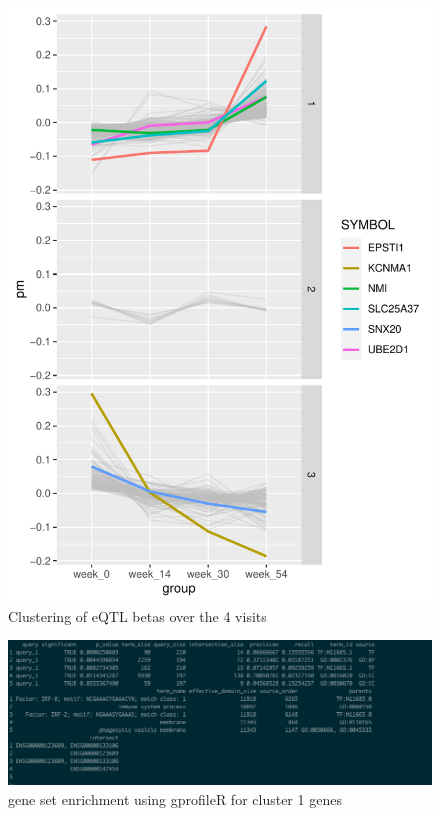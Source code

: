 \begin{outline}
\begin{figure}
    \centering
    \includegraphics[width=1.0\textwidth,page=1]{mainmatter/figures/chapter_04/plot_dge_eqtl.reQTL_clusters.pdf}
    \caption{Clustering of eQTL betas over the 4 visits}
    \label{fig:multipants_reQTL_clusters}
\end{figure}

\begin{figure}
    \centering
    \includegraphics[width=1.0\textwidth,page=1]{mainmatter/figures/chapter_04/Screenshot 2020-08-12 at 21.50.28.png}
    \caption{gene set enrichment using gprofileR for cluster 1 genes}
    \label{fig:multipants_reQTL_clusters_gprofiler}
\end{figure}


\end{outline}
